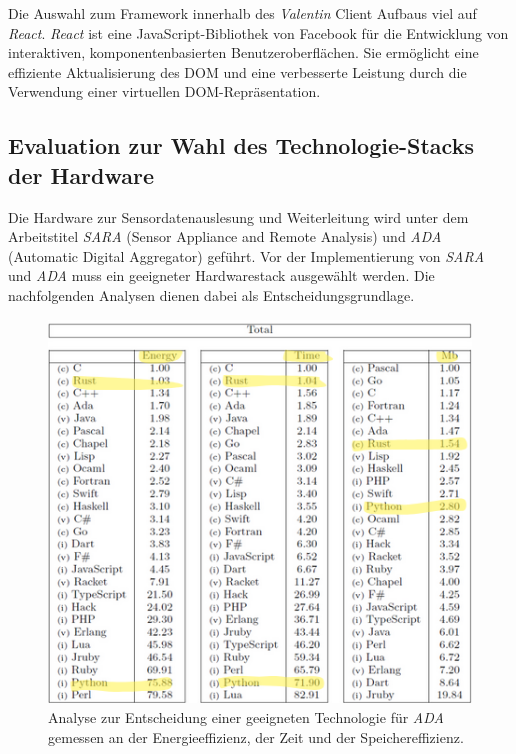 \documentclass[
]{article}
\begin{document}
Die Auswahl zum Framework innerhalb des \textit{Valentin} Client Aufbaus viel auf \textit{React}. \textit{React} ist eine JavaScript-Bibliothek von Facebook für die Entwicklung von interaktiven, komponentenbasierten Benutzeroberflächen. Sie ermöglicht eine effiziente Aktualisierung des DOM und eine verbesserte Leistung durch die Verwendung einer virtuellen DOM-Repräsentation.

\subsection{Evaluation zur Wahl des Technologie-Stacks der Hardware}

Die Hardware zur Sensordatenauslesung und Weiterleitung wird unter dem Arbeitstitel \textit{SARA} (Sensor Appliance and Remote Analysis) und \textit{ADA} (Automatic Digital Aggregator) geführt. Vor der Implementierung von \textit{SARA} und \textit{ADA} muss ein geeigneter Hardwarestack ausgewählt werden. Die nachfolgenden Analysen dienen dabei als Entscheidungsgrundlage.

\begin{figure}
    \centering
    \includegraphics[width=1\textwidth]{./resources/AuswahlRust.png}
    \caption{Analyse zur Entscheidung einer geeigneten Technologie für \textit{ADA} gemessen an der Energieeffizienz, der Zeit und der Speichereffizienz.}
    \label{fig:deine_label}
\end{figure}
\end{document}

